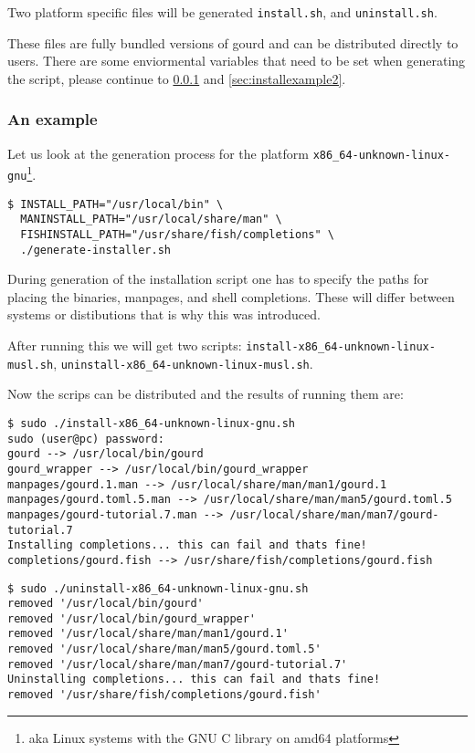 Two platform specific files will be generated \texttt{install.sh}, and \texttt{uninstall.sh}.

These files are fully bundled versions of gourd and can be distributed directly to users.
There are some enviormental variables that need to be set when generating the script,
please continue to \ref{sec:installexample1} and \ref{sec:installexample2}.

\subsubsection{An example}
\label{sec:installexample1}

Let us look at the generation process for the platform \texttt{x86\_64-unknown-linux-gnu}\footnote{aka Linux systems with the GNU C library on amd64 platforms}.

\begin{verbatim}
$ INSTALL_PATH="/usr/local/bin" \
  MANINSTALL_PATH="/usr/local/share/man" \
  FISHINSTALL_PATH="/usr/share/fish/completions" \
  ./generate-installer.sh
\end{verbatim}

During generation of the installation script one has to specify the paths for placing the binaries, manpages, and shell completions.
These will differ between systems or distibutions that is why this was introduced.

After running this we will get two scripts: \texttt{install-x86\_64-unknown-linux-musl.sh}, \texttt{uninstall-x86\_64-unknown-linux-musl.sh}.

Now the scrips can be distributed and the results of running them are:

\begin{verbatim}
$ sudo ./install-x86_64-unknown-linux-gnu.sh
sudo (user@pc) password:
gourd --> /usr/local/bin/gourd
gourd_wrapper --> /usr/local/bin/gourd_wrapper
manpages/gourd.1.man --> /usr/local/share/man/man1/gourd.1
manpages/gourd.toml.5.man --> /usr/local/share/man/man5/gourd.toml.5
manpages/gourd-tutorial.7.man --> /usr/local/share/man/man7/gourd-tutorial.7
Installing completions... this can fail and thats fine!
completions/gourd.fish --> /usr/share/fish/completions/gourd.fish
\end{verbatim}

\begin{verbatim}
$ sudo ./uninstall-x86_64-unknown-linux-gnu.sh
removed '/usr/local/bin/gourd'
removed '/usr/local/bin/gourd_wrapper'
removed '/usr/local/share/man/man1/gourd.1'
removed '/usr/local/share/man/man5/gourd.toml.5'
removed '/usr/local/share/man/man7/gourd-tutorial.7'
Uninstalling completions... this can fail and thats fine!
removed '/usr/share/fish/completions/gourd.fish'
\end{verbatim}


